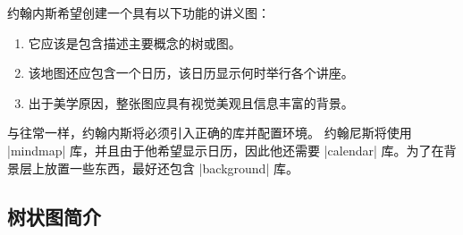 约翰内斯希望创建一个具有以下功能的讲义图：
%
\begin{enumerate}
    \item 它应该是包含描述主要概念的树或图。
    \item 该地图还应包含一个日历，该日历显示何时举行各个讲座。
    \item 出于美学原因，整张图应具有视觉美观且信息丰富的背景。
\end{enumerate}


与往常一样，约翰内斯将必须引入正确的库并配置环境。 约翰尼斯将使用 |mindmap| 库，并且由于他希望显示日历，因此他还需要 |calendar| 库。为了在背景层上放置一些东西，最好还包含 |background| 库。


\subsection{树状图简介}


